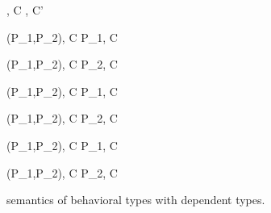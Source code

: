 \begin{figure}
\begin{minipage}{\textwidth}



{ \langle \Endconst, C \rangle \rightarrow {}, C' \rangle }


\begin{minipage}{0.5\textwidth}
{ \langle \Sirx (P_1,P_2), C \rangle \xlongrightarrow{\snull} \langle P_1, C \rangle }
\end{minipage}
\begin{minipage}{0.5\textwidth}
{ \langle \Sirx (P_1,P_2), C \rangle \xlongrightarrow{\snnull} \langle P_2, C\rangle }
\end{minipage}
\vspace{2mm}

\begin{minipage}{0.5\textwidth}
{ \langle \Sirx (P_1,P_2), C \rangle \rightarrow \langle P_1, C \rangle }
\end{minipage}
\begin{minipage}{0.5\textwidth}
{ \langle \Sirx (P_1,P_2), C \rangle \rightarrow \langle P_2, C \rangle }
\end{minipage}


{ \langle \Sirx (P_1,P_2), C \rangle \xlongrightarrow{\snull} \langle P_1, C\cup{\snull} \rangle }

{ \langle \Sirx (P_1,P_2), C \rangle \xlongrightarrow{\snnull} \langle P_2, C\cup{\snnull} \rangle }

 



\end{minipage}
\caption{semantics of behavioral types with dependent types.}
\label{fig:bdRules}
\end{figure}

